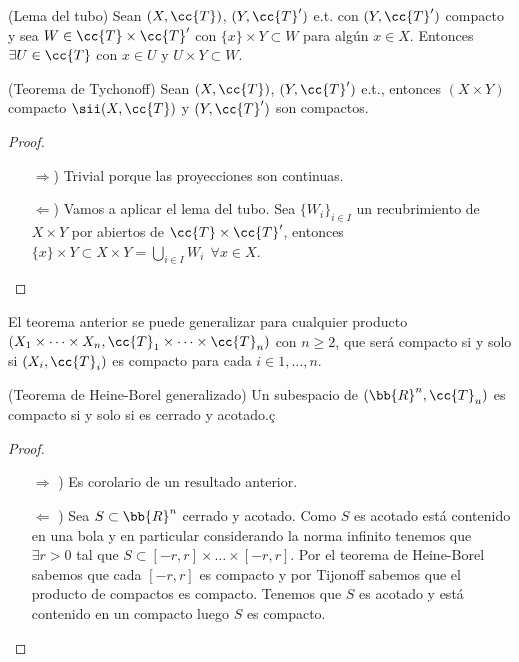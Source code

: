 \begin{lema}
    (Lema del tubo) Sean $(X, \cc{T})$, $(Y, \cc{T}')$ e.t. con $(Y, \cc{T}')$ compacto y sea $W\in \cc{T}\times \cc{T}'$ con $\{x\}\times Y \subset W$ para algún $x\in X$. Entonces $\exists U\in \cc{T}$ con $x\in U$ y $U\times Y \subset W$.
    \endsquare
\end{lema}

\begin{teo}
    (Teorema de Tychonoff) Sean $(X, \cc{T})$, $(Y, \cc{T}')$ e.t., entonces $(X\times Y)$ compacto $\sii (X, \cc{T})$ y $(Y, \cc{T}')$ son compactos.
    \begin{proof}\
        \begin{itemize}
            \item[$\Rightarrow$)] Trivial porque las proyecciones son continuas.
            \item[$\Leftarrow$)] Vamos a aplicar el lema del tubo. Sea $\{W_i\}_{i\in I}$ un recubrimiento de $X\times Y$ por abiertos de $\cc{T}\times \cc{T}'$, entonces $\{x\}\times Y \subset X\times Y = \bigcup\limits_{i\in I}W_i\ \ \forall x \in X$. 
        \end{itemize}
    \end{proof}
\end{teo}

\begin{coro}
    El teorema anterior se puede generalizar para cualquier producto $(X_1\times \dots\times X_n, \cc{T}_1\times \dots\times \cc{T}_n)$ con $n\geq 2$, que será compacto si y solo si $(X_i, \cc{T}_i)$ es compacto para cada $i\in 1,\dots,n$.
    \endsquare
\end{coro}

\begin{teo}
    (Teorema de Heine-Borel generalizado) Un subespacio de $(\bb{R}^n, \cc{T}_u)$ es compacto si y solo si es cerrado y acotado.ç
    \begin{proof}\
        \begin{itemize}
            \item[$\Rightarrow$ )] Es corolario de un resultado anterior.
            \item[$\Leftarrow$ )] Sea $S\subset \bb{R}^n$ cerrado y acotado. Como $S$ es acotado está contenido en una bola y en particular considerando la norma infinito tenemos que $\exists r>0$ tal que $S\subset [-r,r]\times \dots\times [-r,r]$. Por el teorema de Heine-Borel sabemos que cada $[-r,r]$ es compacto y por Tijonoff sabemos que el producto de compactos es compacto. Tenemos que $S$ es acotado y está contenido en un compacto luego $S$ es compacto.  %
        \end{itemize}
    \end{proof}
\end{teo}


